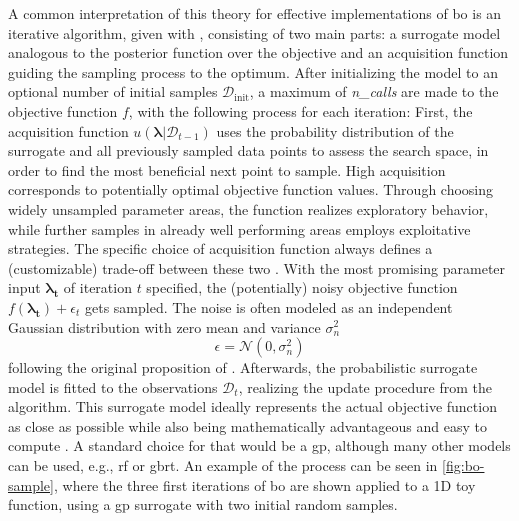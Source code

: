 A common interpretation of this theory for effective implementations of \gls{bo} is an iterative algorithm, given with , consisting of two main parts: a surrogate model analogous to the posterior function over the objective and an acquisition function guiding the sampling process to the optimum. After initializing the model to an optional number of initial samples $\mathcal{D}_\text{init}$, a maximum of \textit{n\_calls} are made to the objective function $f$, with the following process for each iteration: 
First, the acquisition function $u(\mathbf{\lambda}|\mathcal{D}_{t-1})$ uses the probability distribution of the surrogate and all previously sampled data points to assess the search space, in order to find the most beneficial next point to sample. High acquisition corresponds to potentially optimal objective function values. Through choosing widely unsampled parameter areas, the function realizes exploratory behavior, while further samples in already well performing areas employs exploitative strategies. The specific choice of acquisition function always defines a (customizable) trade-off between these two \cite{brochu2010tutorial}. 
With the most promising parameter input $\mathbf{\lambda_t}$ of iteration $t$ specified, the (potentially) noisy objective function $f(\mathbf{\lambda_t}) + \epsilon_t$ gets sampled. The noise is often modeled as an independent Gaussian distribution with zero mean and variance $\sigma_n^2$
\begin{equation}
	\epsilon = \mathcal{N}(0,\sigma_n^2)
\end{equation} 
following the original proposition of \citet{williams2006gaussian}.
Afterwards, the probabilistic surrogate model is fitted to the observations $\mathcal{D}_t$, realizing the update procedure from the algorithm. This surrogate model ideally represents the actual objective function as close as possible while also being mathematically advantageous and easy to compute \cite{feurer2019hyperparameter}. A standard choice for that would be a \gls{gp}, although many other models can be used, e.g., \gls{rf} or \gls{gbrt}.
An example of the process can be seen in \cref{fig:bo-sample}, where the three first iterations of \gls{bo}  are shown applied to a 1D toy function, using a \gls{gp} surrogate with two initial random samples.

